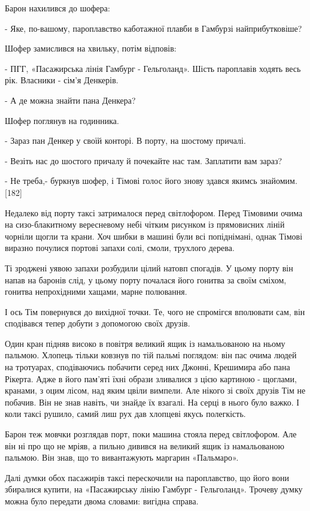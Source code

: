 Барон нахилився до шофера:

- Яке, по-вашому, пароплавство каботажної плавби в Гамбурзі найприбутковіше?

Шофер замислився на хвильку, потім відповів:

- ПГГ, «Пасажирська лінія Гамбург - Гельголанд». Шість пароплавів ходять весь рік. Власники - сім'я Денкерів.

- А де можна знайти пана Денкера?

Шофер поглянув на годинника.

- Зараз пан Денкер у своїй конторі. В порту, на шостому причалі.

- Везіть нас до шостого причалу й почекайте нас там. Заплатити вам зараз?

- Не треба,- буркнув шофер, і Тімові голос його знову здався якимсь знайомим. [182]

Недалеко від порту таксі затрималося перед світлофором. Перед Тімовими очима на сизо-блакитному вересневому небі чітким рисунком із прямовисних ліній чорніли щогли та крани. Хоч шибки в машині були всі попіднімані, однак Тімові виразно почулися портові запахи солі, смоли, трухлого дерева.

Ті зроджені уявою запахи розбудили цілий натовп спогадів. У цьому порту він напав на баронів слід, у цьому порту почалася його гонитва за своїм сміхом, гонитва непрохідними хащами, марне полювання.

І ось Тім повернувся до вихідної точки. Те, чого не спромігся вполювати сам, він сподівався тепер добути з допомогою своїх друзів.

Один кран підняв високо в повітря великий ящик із намальованою на ньому пальмою. Хлопець тільки ковзнув по тій пальмі поглядом: він пас очима людей на тротуарах, сподіваючись побачити серед них Джонні, Крешимира або пана Рікерта. Адже в його пам'яті їхні образи зливалися з цією картиною - щоглами, кранами, з оцим лісом, над яким цвіли вимпели. Але нікого зі своїх друзів Тім не побачив. Він не знав навіть, чи знайде їх взагалі. На серці в нього було важко. І коли таксі рушило, самий лиш рух дав хлопцеві якусь полегкість.

Барон теж мовчки розглядав порт, поки машина стояла перед світлофором. Але він ні про що не мріяв, а пильно дивився на великий ящик із намальованою пальмою. Він знав, що то вивантажують маргарин «Пальмаро».

Далі думки обох пасажирів таксі перескочили на пароплавство, що його вони збиралися купити, на «Пасажирську лінію Гамбург - Гельголанд». Трочеву думку можна було передати двома словами: вигідна справа.

